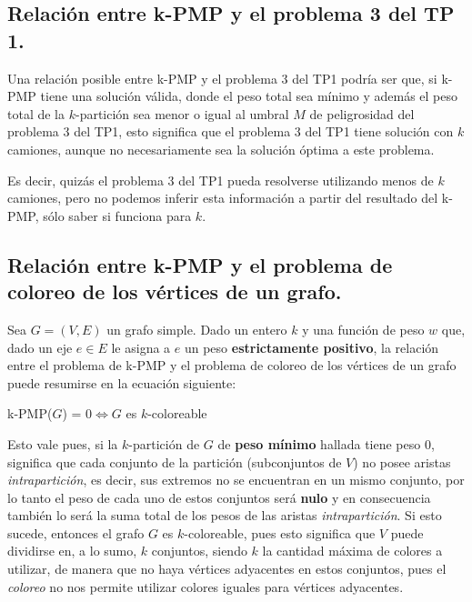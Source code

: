 \subsection{Relación entre k-PMP y el problema 3 del TP 1.}
\vspace*{0.3cm}

Una relación posible entre k-PMP y el problema 3 del TP1 podría ser que, si
k-PMP tiene una solución válida, donde el peso total sea mínimo y además el peso total de la $k$-partición sea menor o igual al umbral $M$ de peligrosidad del problema 3 del TP1, esto significa que el problema 3 del TP1 tiene solución con $k$ camiones, aunque no necesariamente sea la solución óptima a este problema.

Es decir, quizás el problema 3 del TP1 pueda resolverse utilizando menos de $k$
camiones, pero no podemos inferir esta información a partir del resultado del
k-PMP, sólo saber si funciona para $k$.


\newpage
\subsection{Relación entre k-PMP y el problema de coloreo de los vértices de
            un grafo.}
\vspace*{0.3cm}

Sea $G = (V, E)$ un grafo simple. Dado un entero $k$ y una función de peso $w$
que, dado un eje $e \in E$ le asigna a $e$ un peso \textbf{estrictamente positivo}, la relación entre el problema de k-PMP y el problema de coloreo de los vértices de un grafo puede resumirse en la ecuación siguiente:

\begin{center}
  k-PMP($G$) = $0 \iff G$ es $k$-coloreable
\end{center}

Esto vale pues, si la $k$-partición de $G$ de \textbf{peso mínimo} hallada
tiene peso $0$, significa que cada conjunto de la partición (subconjuntos de $V$) no posee aristas \textit{intrapartición}, es decir, sus extremos no se encuentran en un mismo conjunto, por lo tanto el peso de cada uno de estos conjuntos será \textbf{nulo} y en consecuencia también lo será la suma total de los pesos de las aristas \textit{intrapartición}. Si esto sucede, entonces el grafo $G$ es $k$-coloreable, pues esto significa que $V$ puede dividirse en, a lo sumo, $k$ conjuntos, siendo $k$ la cantidad máxima de colores a utilizar, de manera que no haya vértices adyacentes en estos conjuntos, pues el \textit{coloreo} no nos permite utilizar colores iguales para vértices adyacentes.

